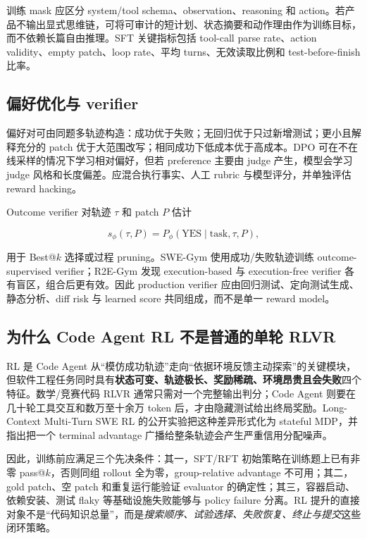 \documentclass[10pt,a4paper,UTF8,fontset=none]{ctexart}
\begin{document}
训练 mask 应区分 system/tool schema、observation、reasoning 和 action。若产品不输出显式思维链，可将可审计的短计划、状态摘要和动作理由作为训练目标，而不依赖长篇自由推理。SFT 关键指标包括 tool-call parse rate、action validity、empty patch、loop rate、平均 turns、无效读取比例和 test-before-finish 比率。

\subsection{偏好优化与 verifier}

偏好对可由同题多轨迹构造：成功优于失败；无回归优于只过新增测试；更小且解释充分的 patch 优于大范围改写；相同成功下低成本优于高成本。DPO 可在不在线采样的情况下学习相对偏好，但若 preference 主要由 judge 产生，模型会学习 judge 风格和长度偏差。应混合执行事实、人工 rubric 与模型评分，并单独评估 reward hacking。

Outcome verifier 对轨迹 $\tau$ 和 patch $P$ 估计

\begin{equation}
s_{\phi}(\tau,P)=P_{\phi}(\mathrm{YES}\mid \text{task},\tau,P),
\label{zh:eq:verifier}
\end{equation}

用于 Best@$k$ 选择或过程 pruning。SWE-Gym 使用成功/失败轨迹训练 outcome-supervised verifier\cite{zh:pan2024swegym}；R2E-Gym 发现 execution-based 与 execution-free verifier 各有盲区，组合后更有效\cite{zh:jain2025r2egym}。因此 production verifier 应由回归测试、定向测试生成、静态分析、diff risk 与 learned score 共同组成，而不是单一 reward model。

\subsection{为什么 Code Agent RL 不是普通的单轮 RLVR}

RL 是 Code Agent 从“模仿成功轨迹”走向“依据环境反馈主动探索”的关键模块，但软件工程任务同时具有\textbf{状态可变、轨迹极长、奖励稀疏、环境昂贵且会失败}四个特征。数学/竞赛代码 RLVR 通常只需对一个完整输出判分；Code Agent 则要在几十轮工具交互和数万至十余万 token 后，才由隐藏测试给出终局奖励。Long-Context Multi-Turn SWE RL 的公开实验把这种差异形式化为 stateful MDP，并指出把一个 terminal advantage 广播给整条轨迹会产生严重信用分配噪声\cite{zh:golubev2025longcontextrl}。

因此，训练前应满足三个先决条件：其一，SFT/RFT 初始策略在训练题上已有非零 pass@$k$，否则同组 rollout 全为零，group-relative advantage 不可用；其二，gold patch、空 patch 和重复运行能验证 evaluator 的确定性；其三，容器启动、依赖安装、测试 flaky 等基础设施失败能够与 policy failure 分离。RL 提升的直接对象不是“代码知识总量”，而是\emph{搜索顺序、试验选择、失败恢复、终止与提交}这些闭环策略。
\end{document}
